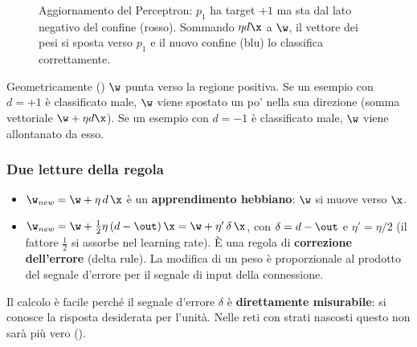 \begin{figure}[ht]
\centering
{}
\caption{Aggiornamento del Perceptron: $p_1$ ha target $+1$ ma sta dal lato negativo del confine (rosso).
Sommando $\eta d\x$ a $\w$, il vettore dei pesi si sposta verso $p_1$ e il nuovo confine (blu) lo classifica
correttamente.}
\label{fig:perceptron-geometria}
\end{figure}

Geometricamente () $\w$ punta verso la regione positiva. Se un esempio con
$d=+1$ è classificato male, $\w$ viene spostato un po' nella sua direzione (somma vettoriale $\w+\eta d\x$). Se un
esempio con $d=-1$ è classificato male, $\w$ viene allontanato da esso.

\subsubsection{Due letture della regola}
\begin{itemize}
  \item $\w_{\mathit{new}} = \w+\eta\,d\,\x$ è un \textbf{apprendimento hebbiano}: $\w$ si muove verso $\x$.
  \item $\w_{\mathit{new}} = \w+\tfrac12\eta\,(d-\out)\,\x = \w + \eta'\,\delta\,\x$, con $\delta = d-\out$ e
        $\eta' = \eta/2$ (il fattore $\tfrac12$ si assorbe nel learning rate). È una regola di \textbf{correzione
        dell'errore} (delta rule). La modifica di un peso è proporzionale al prodotto del segnale d'errore per il
        segnale di input della connessione.
\end{itemize}
Il calcolo è facile perché il segnale d'errore $\delta$ è \textbf{direttamente misurabile}: si conosce la risposta
desiderata per l'unità. Nelle reti con strati nascosti questo non sarà più vero ().

